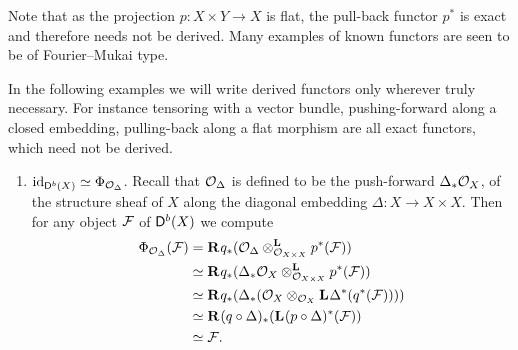 Note that as the projection $p \colon X \times Y \to X$ is flat, the pull-back functor $p^*$ is exact and therefore needs not be derived. Many examples of known functors are seen to be of Fourier--Mukai type.

\begin{example}
    \label{Identifying fm transforms}
    In the following examples we will write derived functors only wherever truly necessary. For instance tensoring with a vector bundle, pushing-forward along a closed embedding, pulling-back along a flat morphism are all exact functors, which need not be derived.
\begin{enumerate}[label = (\roman*)]
    \item{
    $\id{\derb{X}} \iso \fm{\struct{\Delta}}$. Recall that $\struct{\Delta}$ is defined to be the push-forward $\Delta_*\struct{X}$, of the structure sheaf of $X$ along the diagonal embedding $\Delta \colon X \to X \times X$. Then for any object $\F$ of $\derb{X}$ we compute 
    \begin{align*}
        \fm{\struct{\Delta}}(\F) &= \rderived{}{q_*}(\derivedtensor{\struct{\Delta}}{p^*(\F)}{\struct{X \times X}}) \\
        &\iso \rderived{}{q_*}(\derivedtensor{\Delta_*\struct{X}}{{p^*}(\F)}{\struct{X \times X}}) \\
        &\iso \rderived{}{q_*}(\Delta_*(\struct{X} \otimes_{\struct{X}}\lderived{}{\Delta^*}({q^*}(\F)))) \\
        &\iso \rderived{}{(q \circ \Delta)_*}(\lderived{}{(p \circ \Delta)^*}(\F)) \\
        &\iso \F.
    \end{align*}
}
\end{enumerate}
\end{example}

